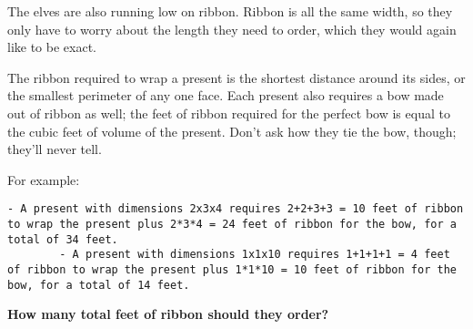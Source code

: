 \documentclass[12pt]{article}
\begin{document}
    The elves are also running low on ribbon. Ribbon is all the same width, so they only have to worry about the length they need to order, which they would again like to be exact.
    
    The ribbon required to wrap a present is the shortest distance around its sides, or the smallest perimeter of any one face. Each present also requires a bow made out of ribbon as well; the feet of ribbon required for the perfect bow is equal to the cubic feet of volume of the present. Don't ask how they tie the bow, though; they'll never tell.
    
    For example:
    
    \begin{lstlisting}[breaklines,basicstyle=\ttfamily]
        - A present with dimensions 2x3x4 requires 2+2+3+3 = 10 feet of ribbon to wrap the present plus 2*3*4 = 24 feet of ribbon for the bow, for a total of 34 feet.
        - A present with dimensions 1x1x10 requires 1+1+1+1 = 4 feet of ribbon to wrap the present plus 1*1*10 = 10 feet of ribbon for the bow, for a total of 14 feet.
    \end{lstlisting}
    
    \textbf{How many total feet of ribbon should they order?}  
    
\end{document}
